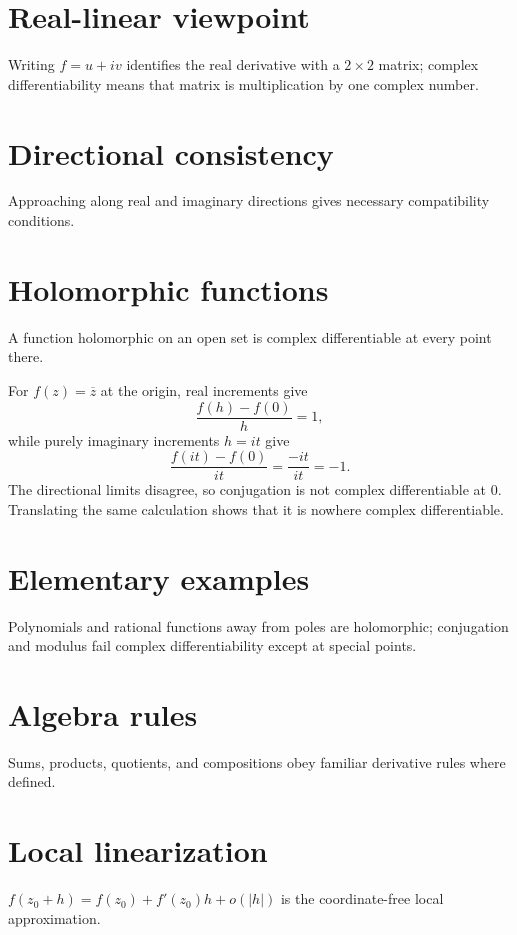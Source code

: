 \section{Real-linear viewpoint}
Writing $f=u+iv$ identifies the real derivative with a $2\times2$ matrix; complex differentiability means that matrix is multiplication by one complex number.

\section{Directional consistency}
Approaching along real and imaginary directions gives necessary compatibility conditions.

\section{Holomorphic functions}
A function holomorphic on an open set is complex differentiable at every point there.

\begin{example}\label{ex:iv01-expand-02}
For \(f(z)=\overline z\) at the origin, real increments give
\[
\frac{f(h)-f(0)}{h}=1,
\]
while purely imaginary increments \(h=it\) give
\[
\frac{f(it)-f(0)}{it}=\frac{-it}{it}=-1.
\]
The directional limits disagree, so conjugation is not complex differentiable at \(0\). Translating the same calculation shows that it is nowhere complex differentiable.
\end{example}
\section{Elementary examples}
Polynomials and rational functions away from poles are holomorphic; conjugation and modulus fail complex differentiability except at special points.

\section{Algebra rules}
Sums, products, quotients, and compositions obey familiar derivative rules where defined.

\section{Local linearization}
$f(z_0+h)=f(z_0)+f'(z_0)h+o(|h|)$ is the coordinate-free local approximation.


